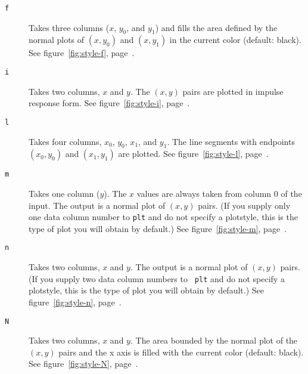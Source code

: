 \documentclass{book}
\begin{document}
\begin{description}
\item[{\tt f}]
%
%
\vspace{1mm}
Takes three columns ($x$, $y_0$, and $y_1$) and fills the area defined
by the normal plots of $(x,y_0)$ and $(x,y_1)$ in the current color
(default: black).
See figure~\ref{fig:style-f}, page~\pageref{fig:style-f}.

\item[{\tt i}]
%
Takes two columns, $x$ and $y$.  The $(x,y)$ pairs are
plotted in impulse response form.
See figure~\ref{fig:style-i}, page~\pageref{fig:style-i}.

\item[{\tt l}]
%
Takes four columns, $x_{0}$, $y_{0}$, $x_{1}$, and $y_{1}$.  The line
segments with endpoints $(x_{0},y_{0})$ and $(x_{1},y_{1})$ are plotted.
See figure~\ref{fig:style-l}, page~\pageref{fig:style-l}.

\item[{\tt m}]
%
%
Takes one column ($y$).  The $x$ values are always taken from column 0
of the input.  The output is a normal plot of $(x,y)$ pairs.  (If you supply
only one data column number to {\tt plt} and do not specify a
plotstyle, this is the type of plot you will obtain by default.)
See figure~\ref{fig:style-m}, page~\pageref{fig:style-m}.

\item[{\tt n}]
%
%
Takes two columns, $x$ and $y$.  The output is a normal plot
of $(x,y)$ pairs.  (If you supply two data column numbers to {\tt
plt} and do not specify a plotstyle, this is the type of plot you will
obtain by default.)
See figure~\ref{fig:style-n}, page~\pageref{fig:style-n}.

\item[{\tt N}]
%
%
Takes two columns, $x$ and $y$.  The area bounded by the normal plot of
the $(x,y)$ pairs and the x axis is filled with the current color (default:
black).
See figure~\ref{fig:style-N}, page~\pageref{fig:style-N}.


\end{description}
\end{document}
